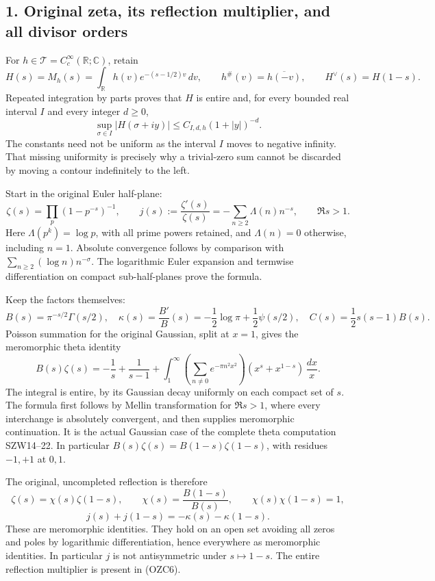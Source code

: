 \documentclass[
  10pt,
  a4paper,
]{article}
\begin{document}
\subsection{1. Original zeta, its reflection multiplier, and all divisor
orders}\label{original-zeta-its-reflection-multiplier-and-all-divisor-orders}

For \(h\in\mathcal T=C_c^\infty(\mathbb R;\mathbb C)\), retain \[
H(s)=M_h(s)=\int_{\mathbb R}h(v)e^{-(s-1/2)v}\,dv,\qquad
h^\#(v)=\overline{h(-v)},\qquad H^\vee(s)=H(1-s).
\tag{OZC1}
\] Repeated integration by parts proves that \(H\) is entire and, for
every bounded real interval \(I\) and every integer \(d\ge0\), \[
\sup_{\sigma\in I}|H(\sigma+iy)|\le C_{I,d,h}(1+|y|)^{-d}.
\tag{OZC2}
\] The constants need not be uniform as the interval \(I\) moves to
negative infinity. That missing uniformity is precisely why a
trivial-zero sum cannot be discarded by moving a contour indefinitely to
the left.

Start in the original Euler half-plane: \[
\zeta(s)=\prod_p(1-p^{-s})^{-1},\qquad
j(s):=\frac{\zeta'(s)}{\zeta(s)}
 =-\sum_{n\ge2}\Lambda(n)n^{-s},\qquad \Re s>1.
\tag{OZC3}
\] Here \(\Lambda(p^k)=\log p\), with all prime powers retained, and
\(\Lambda(n)=0\) otherwise, including \(n=1\). Absolute convergence
follows by comparison with \(\sum_{n\ge2}(\log n)n^{-\sigma}\). The
logarithmic Euler expansion and termwise differentiation on compact
sub-half-planes prove the formula.

Keep the factors themselves: \[
B(s)=\pi^{-s/2}\Gamma(s/2),\quad
\kappa(s)=\frac{B'}B(s)=-\frac12\log\pi+\frac12\psi(s/2),\quad
C(s)=\frac12s(s-1)B(s).
\tag{OZC4}
\] Poisson summation for the original Gaussian, split at \(x=1\), gives
the meromorphic theta identity \[
B(s)\zeta(s)
=-\frac1s+\frac1{s-1}
+\int_1^\infty\left(\sum_{n\ne0}e^{-\pi n^2x^2}\right)
 (x^s+x^{1-s})\,\frac{dx}{x}.
\tag{OZC5}
\] The integral is entire, by its Gaussian decay uniformly on each
compact set of \(s\). The formula first follows by Mellin transformation
for \(\Re s>1\), where every interchange is absolutely convergent, and
then supplies meromorphic continuation. It is the actual Gaussian case
of the complete theta computation SZW14--22. In particular
\(B(s)\zeta(s)=B(1-s)\zeta(1-s)\), with residues \(-1,+1\) at \(0,1\).

The original, uncompleted reflection is therefore \[
\zeta(s)=\chi(s)\zeta(1-s),\qquad
\chi(s)=\frac{B(1-s)}{B(s)},\qquad
\chi(s)\chi(1-s)=1,
\] \[
\boxed{j(s)+j(1-s)=-\kappa(s)-\kappa(1-s).}
\tag{OZC6}
\] These are meromorphic identities. They hold on an open set avoiding
all zeros and poles by logarithmic differentiation, hence everywhere as
meromorphic identities. In particular \(j\) is not antisymmetric under
\(s\mapsto1-s\). The entire reflection multiplier is present in (OZC6).
\end{document}

